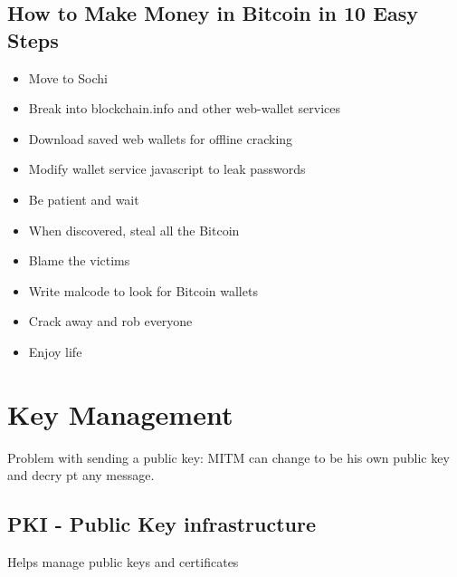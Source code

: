 \documentclass{article}
\begin{document}
\subsection{How to Make Money in Bitcoin in 10 Easy Steps}
\begin{itemize}
\item Move to Sochi
\item Break into blockchain.info and other web-wallet services
\item Download saved web wallets for offline cracking
\item Modify wallet service javascript to leak passwords
\item Be patient and wait
\item When discovered, steal all the Bitcoin
\item Blame the victims
\item Write malcode to look for Bitcoin wallets
\item Crack away and rob everyone
\item Enjoy life
\end{itemize}




\section{Key Management}
Problem with sending a public key: MITM can change to be his own public key and decry pt any message.
\subsection{PKI - Public Key infrastructure }
Helps manage public keys and certificates
\end{document}
